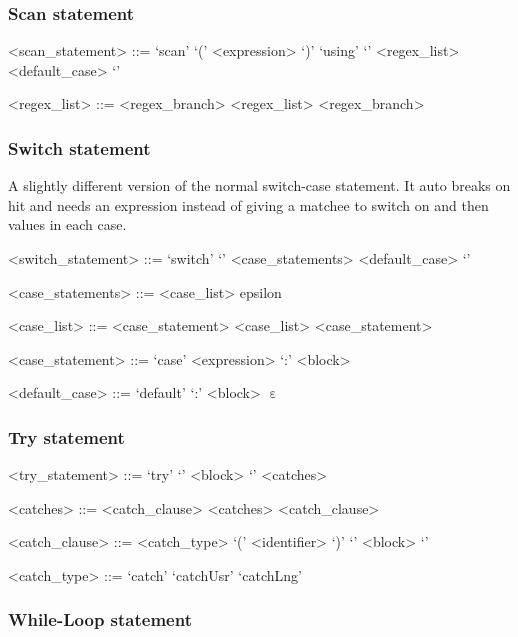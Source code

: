 %
\subsubsection{Scan statement}

\begin{grammar}
<scan_statement> ::= `scan' `(' <expression> `)' `using' `{' <regex_list> <default_case> `}'

<regex_list> ::= <regex_branch>
\alt <regex_list> <regex_branch>
\end{grammar}

%
\subsubsection{Switch statement}

A slightly different version of the normal switch-case statement. It auto breaks on hit and needs an expression instead of giving a matchee to switch on and  then values in each case.

\begin{grammar}
<switch_statement> ::= `switch' `{' <case_statements> <default_case> `}'

<case_statements> ::= <case_list>
\alt epsilon

<case_list> ::= <case_statement>
\alt <case_list> <case_statement>

<case_statement> ::= `case' <expression> `:' <block>

<default_case> ::= `default' `:' <block>
\alt $\upepsilon$
\end{grammar}

%
\subsubsection{Try statement}

\begin{grammar}
<try_statement> ::= `try' `{' <block> `}' <catches>

<catches> ::= <catch_clause>
\alt <catches> <catch_clause>

<catch_clause> ::= <catch_type> `(' <identifier> `)' `{' <block> `}'

<catch_type> ::= `catch'
\alt `catchUsr'
\alt `catchLng'
\end{grammar}

%
\subsubsection{While-Loop statement}

